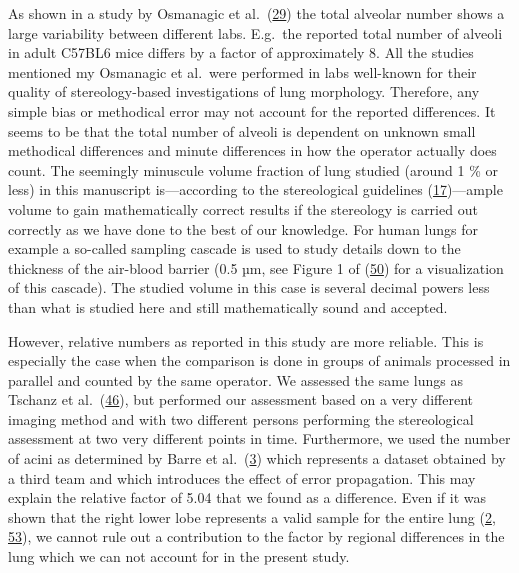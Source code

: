 \documentclass[
  american,
]{article}
\begin{document}
As shown in a study by Osmanagic et al.~(\protect\hyperlink{ref-LzalnLBH}{29}) the total alveolar number shows a large variability between different labs.
E.g.~the reported total number of alveoli in adult C57BL6 mice differs by a factor of approximately 8.
All the studies mentioned my Osmanagic et al.~were performed in labs well-known for their quality of stereology-based investigations of lung morphology.
Therefore, any simple bias or methodical error may not account for the reported differences.
It seems to be that the total number of alveoli is dependent on unknown small methodical differences and minute differences in how the operator actually does count.
The seemingly minuscule volume fraction of lung studied (around 1 \% or less) in this manuscript is---according to the stereological guidelines (\protect\hyperlink{ref-dNc8FfNn}{17})---ample volume to gain mathematically correct results if the stereology is carried out correctly as we have done to the best of our knowledge.
For human lungs for example a so-called sampling cascade is used to study details down to the thickness of the air-blood barrier (0.5 µm, see Figure 1 of (\protect\hyperlink{ref-1CLJ32t5m}{50}) for a visualization of this cascade).
The studied volume in this case is several decimal powers less than what is studied here and still mathematically sound and accepted.

However, relative numbers as reported in this study are more reliable.
This is especially the case when the comparison is done in groups of animals processed in parallel and counted by the same operator.
We assessed the same lungs as Tschanz et al.~(\protect\hyperlink{ref-wnl86DEM}{46}), but performed our assessment based on a very different imaging method and with two different persons performing the stereological assessment at two very different points in time.
Furthermore, we used the number of acini as determined by Barre et al.~(\protect\hyperlink{ref-uFNlWogb}{3}) which represents a dataset obtained by a third team and which introduces the effect of error propagation.
This may explain the relative factor of 5.04 that we found as a difference.
Even if it was shown that the right lower lobe represents a valid sample for the entire lung (\protect\hyperlink{ref-14OP85b2F}{2}, \protect\hyperlink{ref-I9TmP6IU}{53}), we cannot rule out a contribution to the factor by regional differences in the lung which we can not account for in the present study.
\end{document}

